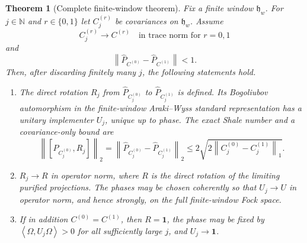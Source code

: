 \documentclass[11pt]{article}
\newtheorem{theorem}{Theorem}[section]
\theoremstyle{remark}
\newcommand{\id}{\mathbf 1}
\newcommand{\norm}[1]{\left\lVert #1\right\rVert}
\newcommand{\ip}[2]{\left\langle #1,#2\right\rangle}
\begin{document}
\begin{theorem}[Complete finite-window theorem]\label{thm:local}
Fix a finite window $\mathfrak h_w$.  For $j\in\mathbb N$ and
$r\in\{0,1\}$ let $C_j^{(r)}$ be covariances on $\mathfrak h_w$.
Assume
\[
 C_j^{(r)}\longrightarrow C^{(r)}
 \quad\text{in trace norm for }r=0,1
\tag{3.5}\label{eq:trace-conv}
\]
and
\[
 \norm{\widehat P_{C^{(0)}}-\widehat P_{C^{(1)}}}<1.
\tag{3.6}\label{eq:angle}
\]
Then, after discarding finitely many $j$, the following statements hold.

\begin{enumerate}[label=\textup{(\alph*)}]
\item The direct rotation $R_j$ from
  $\widehat P_{C_j^{(0)}}$ to $\widehat P_{C_j^{(1)}}$ is defined.
  Its Bogoliubov automorphism in the finite-window Araki--Wyss standard
  representation has a unitary implementer $U_j$, unique up to phase.
  The exact Shale number and a covariance-only bound are
  \[
  \norm{[\widehat P_{C_j^{(0)}},R_j]}_2
  =\norm{\widehat P_{C_j^{(0)}}-\widehat P_{C_j^{(1)}}}_2
  \le2\sqrt{2\norm{C_j^{(0)}-C_j^{(1)}}_1}.
  \tag{3.7}\label{eq:local-shale}
  \]
\item $R_j\to R$ in operator norm, where $R$ is the direct rotation
  of the limiting purified projections.  The phases may be chosen
  coherently so that $U_j\to U$ in operator norm, and hence strongly,
  on the full finite-window Fock space.
\item If in addition $C^{(0)}=C^{(1)}$, then $R=\id$, the phase may be
  fixed by $\ip{\Omega}{U_j\Omega}>0$ for all sufficiently large $j$,
  and $U_j\to\id$.
\end{enumerate}
\end{theorem}
\end{document}

